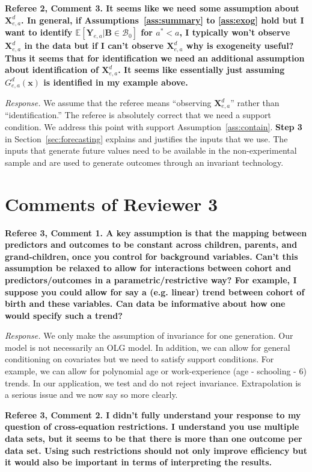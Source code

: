 \noindent \textbf{Referee 2, Comment 3. It seems like we need some assumption about $\bm{X}_{e,a}^d$. In general, if Assumptions~\ref{ass:summary} to \ref{ass:exog} hold but I want to identify $\mathbb{E} \left[ \bm{Y}_{e,a} | \bm{B} \in \mathcal{B}_0 \right]$ for $a^* < a$, I typically won't observe $\bm{X}_{e,a}^d$ in the data but if I can't observe $\bm{X}_{e,a}^d$ why is exogeneity useful? Thus it seems that for identification we need an additional assumption about identification of $\bm{X}_{e,a}^d$. It seems like essentially just assuming $G_{e,a}^d \left( \bm{x} \right)$ is identified in my example above.}

\noindent \textit{Response.} We assume that the referee means ``observing $\bm{X}_{e,a}^d$'' rather than ``identification.'' The referee is absolutely correct that we need a support condition. We address this point with support Assumption~\ref{ass:contain}. \textbf{Step 3} in Section~\ref{sec:forecasting} explains and justifies the inputs that we use. The inputs that generate future values need to be available in the non-experimental sample and are used to generate outcomes through an invariant technology.

\section*{Comments of Reviewer 3}

\noindent \textbf{Referee 3, Comment 1. A key assumption is that the mapping between predictors and outcomes to be constant across children, parents, and grand-children, once you control for background variables. Can't this assumption be relaxed to allow for interactions between cohort and predictors/outcomes in a parametric/restrictive way? For example, I suppose you could allow for say a (e.g. linear) trend between cohort of birth and these variables. Can data be informative about how one would specify such a trend?}

\noindent \textit{Response.} We only make the assumption of invariance for one generation. Our model is not necessarily an OLG model. In addition, we can allow for general conditioning on covariates but we need to satisfy support conditions. For example, we can allow for polynomial age or work-experience (age - schooling - 6) trends. In our application, we test and do not reject invariance. Extrapolation is a serious issue and we now say so more clearly.

\noindent \textbf{Referee 3, Comment 2. I didn't fully understand your response to my question of cross-equation restrictions. I understand you use multiple data sets, but it seems to be that there is more than one outcome per data set. Using such restrictions should not only improve efficiency but it would also be important in terms of interpreting the results.}

